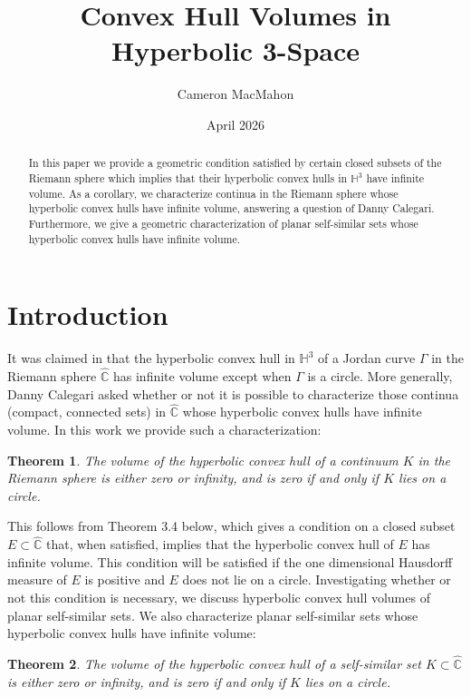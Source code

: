 \documentclass[11pt]{article}
\title{Convex Hull Volumes in Hyperbolic 3-Space}
\author{Cameron MacMahon}
\date{April 2026}
\newtheorem{tm}{Theorem}[section]
\newcommand\comp{{\mathbb{C}}}
\begin{document}
\maketitle

\begin{abstract}
In this paper we provide a geometric condition satisfied by certain closed subsets of the Riemann sphere which implies that their hyperbolic convex hulls in $\mathbb{H}^3$ have infinite volume.  As a corollary, we characterize continua in the Riemann sphere whose hyperbolic convex hulls have infinite volume, answering a question of Danny Calegari. Furthermore, we give a geometric characterization of planar self-similar sets whose hyperbolic convex hulls have infinite volume.

\end{abstract}

\section{Introduction}

It was claimed in \cite{bis} that the hyperbolic convex hull in $\mathbb{H}^3$ of a Jordan curve $\Gamma$ in the Riemann sphere $\hat{\comp}$ has infinite volume except when $\Gamma$ is a circle. More generally, Danny Calegari asked whether or not it is possible to characterize those continua (compact, connected sets) in $\hat{\comp}$ whose hyperbolic convex hulls have infinite volume. In this work we provide such a characterization:

\begin{tm}
    The volume of the hyperbolic convex hull of a continuum $K$ in the Riemann sphere is either zero or infinity, and is zero if and only if $K$ lies on a circle.
\end{tm}

This follows from Theorem 3.4 below, which gives a condition on a closed subset $E \subset \hat{\comp}$ that, when satisfied, implies that the hyperbolic convex hull of $E$ has infinite volume. This condition will be satisfied if the one dimensional Hausdorff measure of $E$ is positive and $E$ does not lie on a circle. Investigating whether or not this condition is necessary, we discuss hyperbolic convex hull volumes of planar self-similar sets. We also characterize planar self-similar sets whose hyperbolic convex hulls have infinite volume:

\begin{tm}
    The volume of the hyperbolic convex hull of a self-similar set $K \subset \hat{\comp}$ is either zero or infinity, and is zero if and only if $K$ lies on a circle.
\end{tm}
\end{document}
